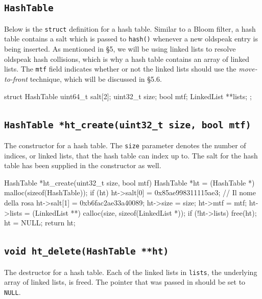 \documentclass{article}
\begin{document}
\subsection{\texttt{HashTable}}

Below is the \texttt{struct} definition for a hash table. Similar to a
Bloom filter, a hash table contains a salt which is passed to
\texttt{hash()} whenever a new oldspeak entry is being inserted. As
mentioned in \S 5, we will be using linked lists to resolve oldspeak
hash collisions, which is why a hash table contains an array of linked
lists. The \texttt{mtf} field indicates whether or not the linked
lists should use the \emph{move-to-front} technique, which will be
discussed in \S 5.6.

\begin{codelisting}{}
struct HashTable {
  uint64_t salt[2];
  uint32_t size;
  bool mtf;
  LinkedList **lists;
};
\end{codelisting}

\subsection{\texttt{HashTable *ht\_create(uint32\_t size, bool mtf)}}

The constructor for a hash table. The \texttt{size} parameter denotes
the number of indices, or linked lists, that the hash table can index up
to. The salt for the hash table has been supplied in the constructor as
well.

\begin{codelisting}{}
HashTable *ht_create(uint32_t size, bool mtf) {
  HashTable *ht = (HashTable *) malloc(sizeof(HashTable));
  if (ht) {
    ht->salt[0] = 0x85ae998311115ae3; // Il nome della rosa
    ht->salt[1] = 0xb6fac2ae33a40089;
    ht->size = size;
    ht->mtf = mtf;
    ht->lists = (LinkedList **) calloc(size, sizeof(LinkedList *));
    if (!ht->lists) {
      free(ht);
      ht = NULL;
    }
  }
  return ht;
}
\end{codelisting}

\subsection{\texttt{void ht\_delete(HashTable **ht)}}

The destructor for a hash table. Each of the linked lists in
\texttt{lists}, the underlying array of linked lists, is freed.
The pointer that was passed in should be set to \texttt{NULL}.
\end{document}
